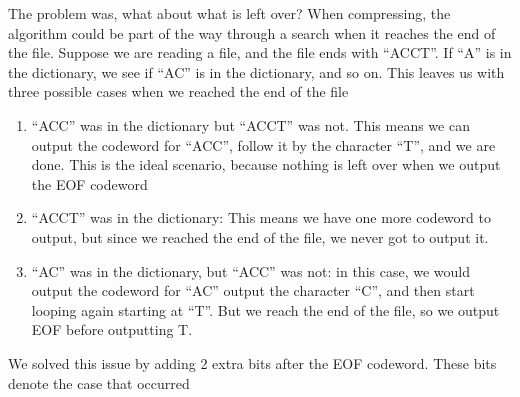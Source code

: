 \documentclass[12pt,twoside]{reedthesis}
\providecommand{\tightlist}{%
  \setlength{\itemsep}{0pt}\setlength{\parskip}{0pt}}
\begin{document}
The problem was, what about what is left over? When compressing, the algorithm could be part of the way through a search when it reaches the end of the file. Suppose we are reading a file, and the file ends with ``ACCT''. If ``A'' is in the dictionary, we see if ``AC'' is in the dictionary, and so on. This leaves us with three possible cases when we reached the end of the file
\begin{enumerate}
\def\labelenumi{\arabic{enumi}.}
\tightlist
\item
  ``ACC'' was in the dictionary but ``ACCT'' was not. This means we can output the codeword for ``ACC'', follow it by the character ``T'', and we are done. This is the ideal scenario, because nothing is left over when we output the EOF codeword
\item
  ``ACCT'' was in the dictionary: This means we have one more codeword to output, but since we reached the end of the file, we never got to output it.
\item
  ``AC'' was in the dictionary, but ``ACC'' was not: in this case, we would output the codeword for ``AC'' output the character ``C'', and then start looping again starting at ``T''. But we reach the end of the file, so we output EOF before outputting T.
\end{enumerate}
We solved this issue by adding 2 extra bits after the EOF codeword. These bits denote the case that occurred
\end{document}
